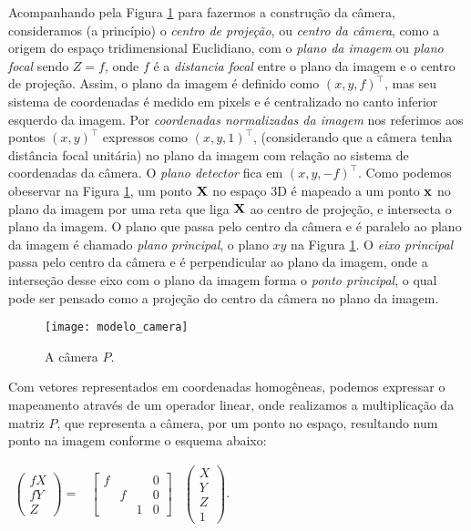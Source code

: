 Acompanhando pela Figura \ref{camera} para fazermos a construção da câmera, consideramos (a princípio) o \textit{centro de projeção}, ou \textit{centro da câmera}, como a origem do espaço tridimensional Euclidiano, com o \textit{plano da imagem} ou \textit{plano focal} sendo $Z = f$, onde $f$ é a \textit{distancia focal} entre o plano da imagem e o centro de projeção. Assim, o plano da imagem é definido como $(x,y,f)^\top$, mas seu sistema de coordenadas é medido em pixels e é centralizado no canto inferior esquerdo da imagem. Por \textit{coordenadas normalizadas da imagem} nos referimos aos pontos $(x,y)^\top$ expressos como $(x,y,1)^\top$, (considerando que a câmera tenha distância focal unitária) no plano da imagem com relação ao sistema de coordenadas da câmera. O \textit{plano detector} fica em $(x,y,-f)^\top$. Como podemos obeservar na Figura \ref{camera}, um ponto $\mathbf{X}$ no espaço 3D é mapeado a um ponto $\mathbf{x}$ no plano da imagem por uma reta que liga $\mathbf{X}$ ao centro de projeção, e intersecta o plano da imagem. O plano que passa pelo centro da câmera e é paralelo ao plano da imagem é chamado \textit{plano principal}, o plano $xy$ na Figura \ref{camera}. O \textit{eixo principal} passa pelo centro da câmera e é perpendicular ao plano da imagem, onde a interseção desse eixo com o plano da imagem forma o \textit{ponto principal}, o qual pode ser pensado como a projeção do centro da câmera no plano da imagem.
\begin{figure}[!htb]{\textwidth}
\caption{A c\^amera $P$.}
\texttt{[image: modelo\_camera]}
\label{camera}
\end{figure}
Com vetores representados em coordenadas homogêneas, podemos expressar o mapeamento através de um operador linear, onde realizamos a multiplicação da matriz $P$, que representa a câmera, por um ponto no espaço, resultando num ponto na imagem conforme o esquema abaixo:
\begin{center}
$
\begin{array}{ccc}
\begin{pmatrix}
fX\\
fY\\
Z
\end{pmatrix} = 
&
\begin{bmatrix}
f& & &0\\
 &f& &0\\
 & &1&0
\end{bmatrix}
&
\begin{pmatrix}
X\\
Y\\
Z\\
1
\end{pmatrix}.
\end{array}
$
\end{center}
